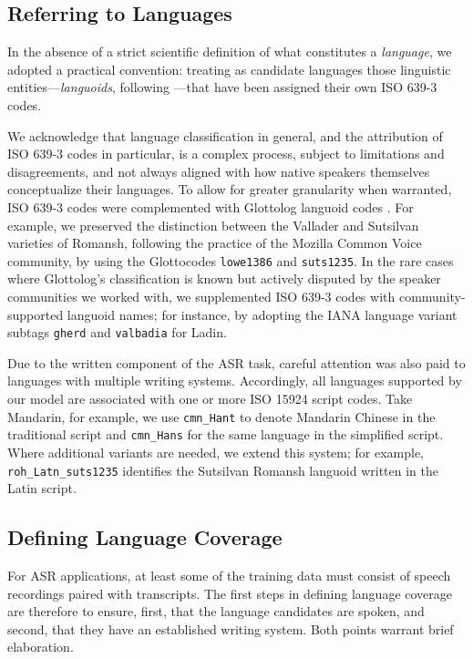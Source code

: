 \documentclass[]{fairmeta}
\begin{document}
\subsection{Referring to Languages}
In the absence of a strict scientific definition of what constitutes a \textit{language}, we adopted a practical convention: treating as candidate languages those linguistic entities—\textit{languoids}, following \citet{good2006modeling}—that have been assigned their own ISO 639-3 codes.

We acknowledge that language classification in general, and the attribution of ISO 639-3 codes in particular, is a complex process, subject to limitations and disagreements, and not always aligned with how native speakers themselves conceptualize their languages. To allow for greater granularity when warranted, ISO 639-3 codes were complemented with Glottolog languoid codes \citep{hammerstrom2024glottolog}. For example, we preserved the distinction between the Vallader and Sutsilvan varieties of Romansh, following the practice of the Mozilla Common Voice community, by using the Glottocodes \texttt{lowe1386} and \texttt{suts1235}. In the rare cases where Glottolog’s classification is known but actively disputed by the speaker communities we worked with, we supplemented ISO 639-3 codes with community-supported languoid names; for instance, by adopting the IANA language variant subtags \texttt{gherd} and \texttt{valbadia} for Ladin.

Due to the written component of the ASR task, careful attention was also paid to languages with multiple writing systems. Accordingly, all languages supported by our model are associated with one or more ISO 15924 script codes. Take Mandarin, for example, we use \texttt{cmn\_Hant} to denote Mandarin Chinese in the traditional script and \texttt{cmn\_Hans} for the same language in the simplified script. Where additional variants are needed, we extend this system; for example, \texttt{roh\_Latn\_suts1235} identifies the Sutsilvan Romansh languoid written in the Latin script.

\subsection{Defining Language Coverage}\label{sec:data:coverage}
For ASR applications, at least some of the training data must consist of speech recordings paired with transcripts. The first steps in defining language coverage are therefore to ensure, first, that the language candidates are spoken, and second, that they have an established writing system. Both points warrant brief elaboration.
\end{document}
